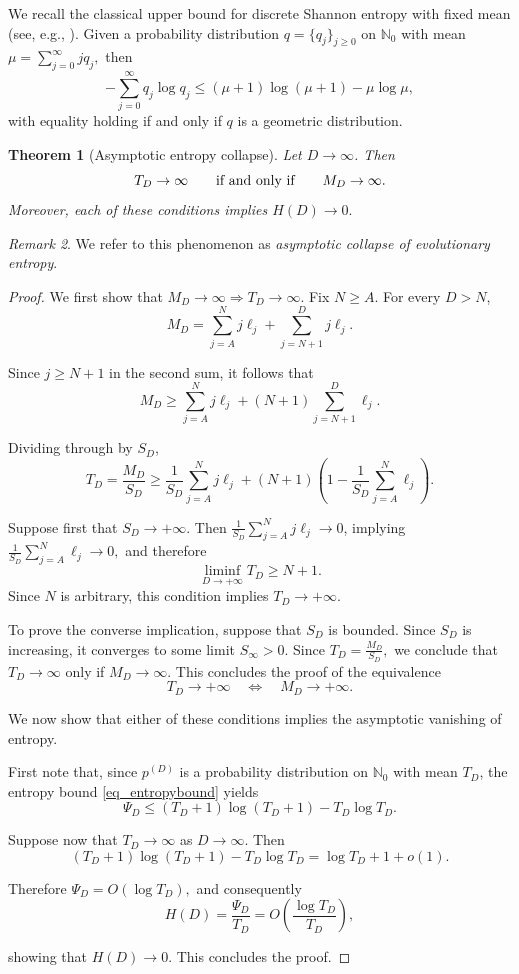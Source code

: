 \documentclass[10pt,a4paper]{amsart}
\newtheorem{thm}{Theorem}[section]
\theoremstyle{definition}
\theoremstyle{remark}
\newtheorem{rem}[thm]{Remark}
\numberwithin{equation}{section}
\begin{document}
We recall the classical upper bound for discrete
Shannon entropy with fixed mean (see, e.g.,
\cite{CoverThomas}). Given a probability distribution
$
q=\{q_j\}_{j\geq0}
$
on \(\mathbb N_0\) with mean
$
\mu
=
\sum_{j=0}^{\infty} j q_j,
$
then
\begin{equation}
\label{eq_entropybound}
-
\sum_{j=0}^{\infty}
q_j\log q_j
\leq
(\mu+1)\log(\mu+1)-\mu\log\mu,
\end{equation}
with equality holding if and only if \(q\) is a geometric distribution.

\begin{thm}[Asymptotic entropy collapse]
\label{thm:entropy-collapse}
Let \(D\to\infty\). Then
\[
T_D\to\infty
\qquad\mbox{\rm if and only if}\qquad
M_D\to\infty.
\]
Moreover, each of these conditions implies
$
H(D)\to0.
$
\end{thm}

\begin{rem}
We refer to this phenomenon as {\em asymptotic collapse of evolutionary entropy}.
\end{rem}

\begin{proof}

We first show that
$
M_D\to\infty
\Longrightarrow
T_D\to\infty.
$
Fix \(N\geq A\). For every \(D>N\),
\[
M_D
=
\sum_{j=A}^{N} j\ell_j
+
\sum_{j=N+1}^{D} j\ell_j.
\]

Since \(j\geq N+1\) in the second sum, it follows that
\[ 
M_D
\geq
\sum_{j=A}^{N} j\ell_j
+
(N+1)
\sum_{j=N+1}^{D}\ell_j.
\]

Dividing through by \(S_D\),
\[
T_D
=
\frac{M_D}{S_D}
\geq
\frac1{S_D}
\sum_{j=A}^{N} j\ell_j
+
(N+1)
\left(
1-
\frac1{S_D}
\sum_{j=A}^{N}\ell_j
\right).
\]

\noindent Suppose first that \(S_D\to+\infty\). Then
$
\frac1{S_D}
\sum_{j=A}^{N} j\ell_j
\to0 $, implying 
$
\frac1{S_D}
\sum_{j=A}^{N}\ell_j
\to0, 
$ and therefore
\[
\liminf_{D\to+\infty}T_D
\geq
N+1.
\]
Since \(N\) is arbitrary, this condition  implies
$
T_D\to+\infty.
$

To prove the converse implication, suppose that \(S_D\) is bounded.
Since \(S_D\) is increasing, it converges to some limit $
S_\infty>0.$ 
Since 
$
T_D
=
\frac{M_D}{S_D},
$
we conclude that \(T_D\to\infty\) only if \(M_D\to\infty\). This concludes the proof of the equivalence
\[
T_D\to+\infty
\quad\Longleftrightarrow\quad
M_D\to+\infty.
\]

We now show that either of these conditions implies the asymptotic vanishing of entropy.


First note that, since \(p^{(D)}\) is a probability distribution on
\(\mathbb N_0\) with mean \(T_D\), the entropy bound
\eqref{eq_entropybound} yields
\[
\Psi_D
\leq
(T_D+1)\log(T_D+1)
-
T_D\log T_D.
\]


Suppose now that $T_D \to \infty$ as $D \to \infty$. Then 
\[
(T_D+1)\log(T_D+1)
-
T_D\log T_D
=
\log T_D+1+o(1).
\]

Therefore
$
\Psi_D
=
O(\log T_D),
$
and consequently
\[
H(D)
=
\frac{\Psi_D}{T_D}
=
O\!\left(
\frac{\log T_D}{T_D}
\right),
\]

showing that
$
H(D)\to0
$. This concludes the proof.

\end{proof}
\end{document}

